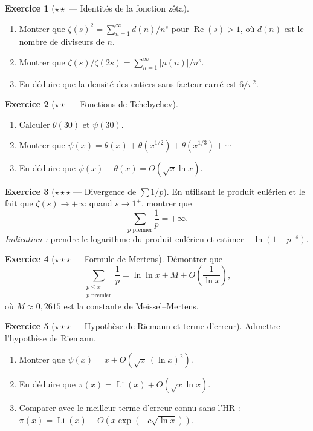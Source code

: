 \documentclass[12pt,a4paper,openany]{book}
\theoremstyle{definition}
\newtheorem{exercice}{Exercice}[chapter]
\theoremstyle{plain}
\theoremstyle{remark}
\newcommand{\abs}[1]{\left|#1\right|}
\begin{document}
\begin{exercice}[$\star\star$ --- Identités de la fonction zêta]
\label{exo:identites-zeta}
\begin{enumerate}[label=(\alph*)]
  \item Montrer que $\zeta(s)^2 = \sum_{n=1}^{\infty} d(n)/n^s$ pour $\operatorname{Re}(s) > 1$,
    où $d(n)$ est le nombre de diviseurs de $n$.
  \item Montrer que $\zeta(s)/\zeta(2s) = \sum_{n=1}^{\infty} \abs{\mu(n)}/n^s$.
  \item En déduire que la densité des entiers sans facteur carré est $6/\pi^2$.
\end{enumerate}
\end{exercice}

\begin{exercice}[$\star\star$ --- Fonctions de Tchebychev]
\label{exo:tchebychev}
\begin{enumerate}[label=(\alph*)]
  \item Calculer $\theta(30)$ et $\psi(30)$.
  \item Montrer que $\psi(x) = \theta(x) + \theta(x^{1/2}) + \theta(x^{1/3}) + \cdots$
  \item En déduire que $\psi(x) - \theta(x) = O(\sqrt{x} \ln x)$.
\end{enumerate}
\end{exercice}

\begin{exercice}[$\star\star\star$ --- Divergence de $\sum 1/p$]
\label{exo:divergence-somme-premiers}
En utilisant le produit eulérien et le fait que $\zeta(s) \to +\infty$ quand
$s \to 1^+$, montrer que
\[
  \sum_{p \text{ premier}} \frac{1}{p} = +\infty.
\]
\textit{Indication :} prendre le logarithme du produit eulérien et estimer
$-\ln(1-p^{-s})$.
\end{exercice}

\begin{exercice}[$\star\star\star$ --- Formule de Mertens]
\label{exo:mertens}
Démontrer que
\[
  \sum_{\substack{p \leq x \\ p \text{ premier}}} \frac{1}{p}
  = \ln \ln x + M + O\!\left(\frac{1}{\ln x}\right),
\]
où $M \approx 0{,}2615$ est la constante de Meissel--Mertens.
\end{exercice}

\begin{exercice}[$\star\star\star$ --- Hypothèse de Riemann et terme d'erreur]
\label{exo:RH-erreur}
Admettre l'hypothèse de Riemann.
\begin{enumerate}[label=(\alph*)]
  \item Montrer que $\psi(x) = x + O(\sqrt{x}\, (\ln x)^2)$.
  \item En déduire que $\pi(x) = \operatorname{Li}(x) + O(\sqrt{x} \ln x)$.
  \item Comparer avec le meilleur terme d'erreur connu sans l'HR :
    $\pi(x) = \operatorname{Li}(x) + O(x \exp(-c\sqrt{\ln x}))$.
\end{enumerate}
\end{exercice}
\end{document}
